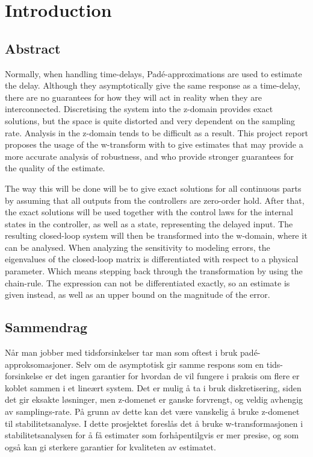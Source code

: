 \chapter{Introduction}


\section{Abstract}
Normally, when handling time-delays, Padé-approximations are used to estimate the delay. Although they asymptotically give the same response as a time-delay, there are no guarantees for how they will act in reality when they are interconnected. Discretising the system into the z-domain provides exact solutions, but the space is quite distorted and very dependent on the sampling rate. Analysis in the z-domain tends to be difficult as a result. This project report proposes the usage of the w-transform with to give estimates that may provide a more accurate analysis of robustness, and who provide stronger guarantees for the quality of the estimate.

The way this will be done will be to give exact solutions for all continuous parts by assuming that all outputs from the controllers are zero-order hold. After that, the exact solutions will be used together with the control laws for the internal states in the controller, as well as a state, representing the delayed input. The resulting closed-loop system will then be transformed into the w-domain, where it can be analysed. When analyzing the sensitivity to modeling errors, the eigenvalues of the closed-loop matrix is differentiated with respect to a physical parameter. Which means stepping back through the transformation by using the chain-rule. The expression can not be differentiated exactly, so an estimate is given instead, as well as an upper bound on the magnitude of the error. 

\section{Sammendrag}
Når man jobber med tidsforsinkelser tar man som oftest i bruk padé-approksomasjoner. Selv om de asymptotisk gir samme respons som en tids-forsinkelse er det ingen garantier for hvordan de vil fungere i praksis om flere er koblet sammen i et lineært system. Det er mulig å ta i bruk diskretisering, siden det gir eksakte løsninger, men z-domenet er ganske forvrengt, og veldig avhengig av samplings-rate. På grunn av dette kan det være vanskelig å bruke z-domenet til stabilitetsanalyse. I dette prosjektet foreslås det å bruke w-transformasjonen i stabilitetsanalysen for å få estimater som forhåpentilgvis er mer presise, og som også kan gi sterkere garantier for kvaliteten av estimatet. 